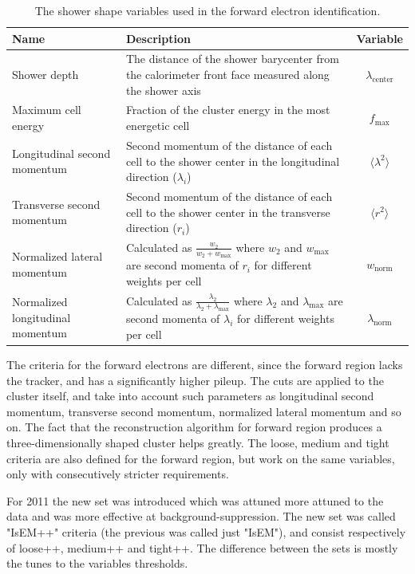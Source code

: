 \begin{table}
\begin{center}
\begin{tabular}{p{4cm}p{8cm}c}
\hline
\hline
Name & Description & Variable \\
\hline
Shower depth & The distance of the shower barycenter from the calorimeter front face measured along the shower axis & $\lambda_\mathrm{center}$ \\
Maximum cell energy & Fraction of the cluster energy in the most energetic cell & $f_\mathrm{max} $ \\
Longitudinal second momentum & Second momentum of the distance of each cell to the shower center in the longitudinal direction ($\lambda_i$) & $\langle \lambda^2 \rangle$ \\
Transverse second momentum & Second momentum of the distance of each cell to the shower center in the transverse direction ($r_i$) & $\langle r^2 \rangle$ \\
Normalized lateral momentum & Calculated as $\frac{w_2}{w_2+w_\mathrm{max}}$ where $w_2$ and $w_\mathrm{max}$ are second momenta of $r_i$ for different weights per cell & $w_\mathrm{norm}$ \\
Normalized longitudinal momentum & Calculated as $\frac{\lambda_2}{\lambda_2+\lambda_\mathrm{max}}$ where $\lambda_2$ and $\lambda_\mathrm{max}$ are second momenta of $\lambda_i$ for different weights per cell & $\lambda_\mathrm{norm}$ \\

\hline \hline

\end{tabular}
\caption{The shower shape variables used in the forward electron identification.}
\label{tab:rec_showershapes}
\end{center}
\end{table}


The criteria for the forward electrons are different, since the forward region lacks the tracker, and has a significantly higher pileup. The cuts are applied to the cluster itself, and take into account such parameters as longitudinal second momentum, transverse second momentum, normalized lateral momentum and so on. The fact that the reconstruction algorithm for forward region produces a three-dimensionally shaped cluster helps greatly. The loose, medium and tight criteria are also defined for the forward region, but work on the same variables, only with consecutively stricter requirements.

For 2011 the new set was introduced which was attuned more attuned to the data and was more effective at background-suppression. The new set was called "IsEM++" criteria (the previous was called just "IsEM"), and consist respectively of loose++, medium++ and tight++. The difference between the sets is mostly the tunes to the variables thresholds.

